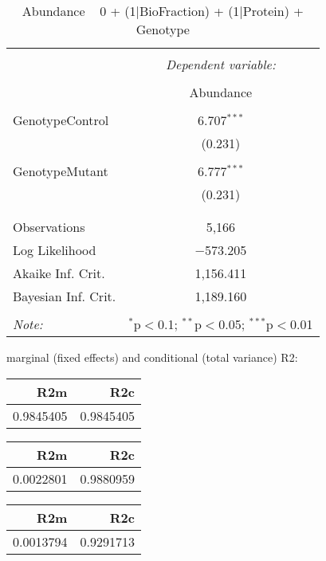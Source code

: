 \documentclass[11pt]{report}
\begin{document}
\begin{table}[!htbp] \centering 
  \caption{Abundance ~ 0 + (1|BioFraction) + (1|Protein) + Genotype} 
  \label{} 
\begin{tabular}{@{\extracolsep{5pt}}lc} 
\\[-1.8ex]\hline 
\hline \\[-1.8ex] 
 & \multicolumn{1}{c}{\textit{Dependent variable:}} \\ 
\cline{2-2} 
\\[-1.8ex] & Abundance \\ 
\hline \\[-1.8ex] 
 GenotypeControl & 6.707$^{***}$ \\ 
  & (0.231) \\ 
  & \\ 
 GenotypeMutant & 6.777$^{***}$ \\ 
  & (0.231) \\ 
  & \\ 
\hline \\[-1.8ex] 
Observations & 5,166 \\ 
Log Likelihood & $-$573.205 \\ 
Akaike Inf. Crit. & 1,156.411 \\ 
Bayesian Inf. Crit. & 1,189.160 \\ 
\hline 
\hline \\[-1.8ex] 
\textit{Note:}  & \multicolumn{1}{r}{$^{*}$p$<$0.1; $^{**}$p$<$0.05; $^{***}$p$<$0.01} \\ 
\end{tabular} 
\end{table} 
marginal (fixed effects) and conditional (total variance) R2:

\begin{tabular}{r|r}
\hline
R2m & R2c\\
\hline
0.9845405 & 0.9845405\\
\hline
\end{tabular}

\begin{tabular}{r|r}
\hline
R2m & R2c\\
\hline
0.0022801 & 0.9880959\\
\hline
\end{tabular}

\begin{tabular}{r|r}
\hline
R2m & R2c\\
\hline
0.0013794 & 0.9291713\\
\hline
\end{tabular}
\end{document}
